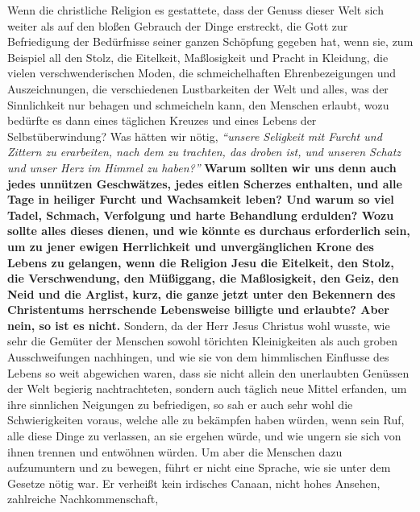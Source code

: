 Wenn die christliche Religion es gestattete, dass der Genuss dieser Welt sich
weiter als auf den bloßen Gebrauch der Dinge erstreckt, die Gott zur
Befriedigung der Bedürfnisse seiner ganzen Schöpfung gegeben hat, wenn sie, zum Beispiel
all den Stolz, die Eitelkeit, Maßlosigkeit
und Pracht in Kleidung, die vielen
verschwenderischen Moden, die schmeichelhaften Ehrenbezeigungen und
Auszeichnungen, die verschiedenen Lustbarkeiten der Welt und alles, was der
Sinnlichkeit nur behagen und schmeicheln kann, den Menschen erlaubt, wozu
bedürfte es dann eines täglichen Kreuzes und eines Lebens
der Selbstüberwindung?
Was hätten wir nötig,
\textit{"`unsere Seligkeit mit Furcht und Zittern zu
erarbeiten,
nach dem zu trachten, das droben ist, und unseren Schatz und unser Herz im
Himmel
zu haben?"'} \label{ref:16_01_warum}
\textbf{Warum sollten wir uns denn auch jedes unnützen Geschwätzes, jedes
eitlen Scherzes enthalten, und alle Tage in heiliger Furcht und Wachsamkeit
leben? Und warum so viel Tadel, Schmach, Verfolgung und harte Behandlung
erdulden? Wozu sollte alles dieses dienen, und wie könnte es durchaus
erforderlich sein, um zu jener ewigen Herrlichkeit und unvergänglichen Krone
des Lebens zu gelangen, wenn die Religion Jesu die
Eitelkeit, den Stolz, die
Verschwendung, den Müßiggang, die Maßlosigkeit,
den Geiz, den Neid und die
Arglist, kurz, die ganze jetzt unter den Bekennern des Christentums
herrschende Lebensweise billigte und erlaubte? Aber nein, so ist es nicht.}
Sondern, da der Herr Jesus Christus wohl wusste, wie sehr die Gemüter der
Menschen sowohl törichten Kleinigkeiten als auch groben Ausschweifungen
nachhingen, und wie sie von dem himmlischen Einflusse des Lebens so weit
abgewichen waren, dass sie nicht allein den unerlaubten Genüssen der Welt
begierig nachtrachteten, sondern auch täglich neue Mittel erfanden, um ihre
sinnlichen Neigungen zu befriedigen, so sah er auch sehr wohl die
Schwierigkeiten voraus, welche alle zu bekämpfen haben würden, wenn sein Ruf,
alle diese Dinge zu verlassen, an sie ergehen würde, und wie ungern sie sich von
ihnen trennen und entwöhnen würden. Um aber die Menschen dazu aufzumuntern und
zu bewegen, führt er nicht eine Sprache, wie sie unter dem Gesetze nötig war. Er
verheißt kein irdisches Canaan, nicht hohes
Ansehen, zahlreiche Nachkommenschaft,
